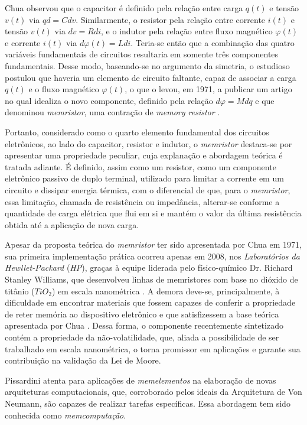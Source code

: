 \documentclass{ceel}
\begin{document}
\begin{multicols}{2}
Chua observou que o capacitor é definido pela relação entre carga $q(t)$ e tensão $v(t)$ via $qd=C dv$. Similarmente, o resistor pela relação entre corrente $i(t)$ e tensão $v(t)$ via $dv=R di$, e o indutor pela relação entre fluxo magnético $\varphi(t)$ e corrente $i(t)$ via $d\varphi(t)=L di$. Teria-se então que a combinação das quatro variáveis fundamentais de circuitos resultaria em somente três componentes fundamentais.
Desse modo, baseando-se no argumento da simetria, o estudioso postulou que haveria um elemento de circuito faltante, capaz de associar a carga $q(t)$ e o fluxo magnético $\varphi(t)$, o que o levou, em 1971, a publicar um artigo no qual idealiza o novo componente, definido pela relação $d\varphi=M dq$ e que denominou \emph{memristor}, uma contração de \emph{memory resistor} \cite{artigo}. 

Portanto, considerado como o quarto elemento fundamental dos circuitos eletrônicos, ao lado do capacitor, resistor e indutor, o \emph{memristor} destaca-se por apresentar uma propriedade peculiar, cuja explanação e abordagem teórica é tratada adiante. É definido, assim como um resistor, como um componente eletrônico passivo de duplo terminal, utilizado para limitar a corrente em um circuito e dissipar energia térmica, com o diferencial de que, para o \emph{memristor}, essa limitação, chamada de resistência ou impedância, alterar-se conforme a quantidade de carga elétrica que flui em si e mantém o valor da última resistência obtida até a aplicação de nova carga.

Apesar da proposta teórica do \emph{memristor} ter sido apresentada por Chua em 1971, sua primeira implementação prática ocorreu apenas em 2008, nos \emph{Laboratórios da Hewllet-Packard} (\emph{HP}), graças à equipe liderada pelo físico-químico Dr. Richard Stanley Williams, que desenvolveu linhas de memristores com base no dióxido de titânio ($TiO_2$) em escala nanométrica \cite{nature}. A demora deve-se, principalmente, à dificuldade em encontrar materiais que fossem capazes de conferir a propriedade de reter memória ao dispositivo eletrônico e que satisfizessem a base teórica apresentada por Chua \cite{artigo}.
Dessa forma, o componente recentemente sintetizado contém a propriedade da não-volatilidade, que, aliada a possibilidade de ser trabalhado em escala nanométrica, o torna promissor em aplicações e garante sua contribuição na validação da Lei de Moore.

Pissardini \cite{memcomputacao} atenta para aplicações de \emph{memelementos} na elaboração de novas arquiteturas computacionais, que, corroborado pelos ideais da Arquitetura de Von Neumann, são capazes de realizar tarefas específicas. Essa abordagem tem sido conhecida como \emph{memcomputação}.


\end{multicols}
\end{document}
